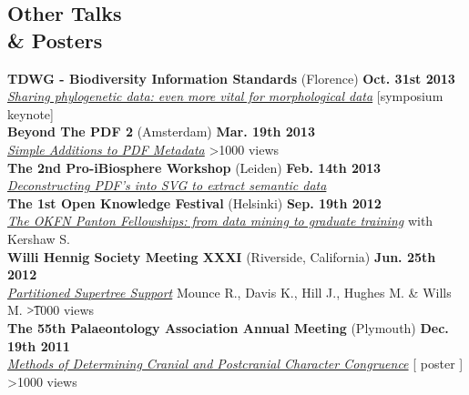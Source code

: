 \documentclass[margin,line]{resume}
\begin{document}
\begin{resume}
    \section{\mysidestyle Other Talks\\ \&  Posters}

\vspace{-7 mm}
\textbf{TDWG - Biodiversity Information Standards} (Florence) \hfill \textbf{Oct. 31st 2013}\\
  \textsl{\href{http://wiki.tdwg.org/twiki/bin/view/Phylogenetics/PhyloSharingWorkshop2013}{Sharing phylogenetic data: even more vital for morphological data}} [symposium keynote] \\

\vspace{-7 mm}
 \textbf{Beyond The PDF 2} (Amsterdam) \hfill \textbf{Mar. 19th 2013}\\
    \textsl{\href{http://www.slideshare.net/rossmounce/simple-additions-to-metadata}{Simple Additions to PDF Metadata}} \hfill {\color{red} 		\textgreater 1000 views}\\

\vspace{-7 mm}
\textbf{The 2nd Pro-iBiosphere Workshop} (Leiden) \hfill \textbf{Feb. 14th 2013}\\
    \textsl{\href{http://wiki.pro-ibiosphere.eu/wiki/Workshops_Leiden_February_2013}{Deconstructing PDF's into SVG to extract semantic data}}\\


\vspace{-7 mm}
\textbf{The 1st Open Knowledge Festival} (Helsinki) \hfill \textbf{Sep. 19th 2012}\\
\textsl{\href{http://okfestival.org/open-research-and-education/}{The OKFN Panton Fellowships: from data mining to graduate training}} with Kershaw S. \\
    
\vspace{-7 mm}
\textbf{Willi Hennig Society Meeting XXXI} (Riverside, California) \hfill \textbf{Jun. 25th 2012}\\
  \textsl{\href{http://prezi.com/xvas71fzr-am/hennig-xxxi/}{Partitioned Supertree Support}} Mounce R., Davis K., Hill J., Hughes M. \& Wills M. \hfill {\color{red} \t	\textgreater1000 views}\\

\vspace{-7 mm}
    \textbf{The 55th Palaeontology Association Annual Meeting} (Plymouth) \hfill \textbf{Dec. 19th 2011}\\
    \textsl{\href{http://rossmounce.co.uk/posters/}{Methods of Determining Cranial and Postcranial Character Congruence}} [ poster ]\hfill {\color{red} \textgreater 1000 views}\\


\end{resume}
\end{document}
